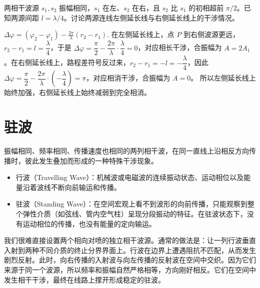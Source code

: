 \documentclass[lang=cn,11pt]{elegantbook}
\begin{document}
\begin{exercise}[两相干波源有初相差时为什么左右延长线不一样]
两相干波源 \(s_1,s_2\) 振幅相同，\(s_1\) 在左、\(s_2\) 在右，且 \(s_2\) 比 \(s_1\) 的初相超前 \(\pi/2\)。已知两源间距 \(l=\lambda/4\)。讨论两源连线左侧延长线与右侧延长线上的干涉情况。
\end{exercise}
\begin{solution}
 \(\Delta\varphi=(\varphi_2-\varphi_1)-\frac{2\pi}{\lambda}(r_2-r_1).\) 
在左侧延长线上，点 \(P\) 到右侧波源更远，\(r_2-r_1=l=\dfrac{\lambda}{4}\)，于是 \(\Delta\varphi=\dfrac{\pi}{2}-\dfrac{2\pi}{\lambda}\cdot\dfrac{\lambda}{4}=0\)，对应相长干涉，合振幅为 \(A=2A_1\)。在右侧延长线上，路程差符号反过来，\(r_2-r_1=-l=-\dfrac{\lambda}{4}\)，因此 \(\Delta\varphi=\dfrac{\pi}{2}-\dfrac{2\pi}{\lambda}\cdot\left(-\dfrac{\lambda}{4}\right)=\pi\)，对应相消干涉，合振幅为 \(A=0\)。
所以左侧延长线上始终加强，右侧延长线上始终减弱到完全相消。
\end{solution}

\section{驻波}

\begin{definition}[驻波]
振幅相同、频率相同、传播速度也相同的两列相干波，在同一直线上沿相反方向传播时，彼此发生叠加而形成的一种特殊干涉现象。
\begin{itemize}
\item 行波（Travelling Wave）：机械波或电磁波的连续振动状态、运动相位以及能量沿着波线不断向前输运和传播。
\item 驻波（Standing Wave）：在空间宏观上看不到波形的向前传播，只能观察到整个弹性介质（如弦线、管内空气柱）呈现分段振动的特征。在驻波状态下，没有运动相位的传播，也没有能量的定向输运。
\end{itemize}
\end{definition}

\begin{note}
我们很难直接设置两个相向对喷的独立相干波源。通常的做法是：让一列行波垂直入射到两种不同介质的终止分界界面上。行波在边界上遭遇阻抗不匹配，从而发生剧烈反射。此时，向右传播的入射波与向左传播的反射波在空间中交织。因为它们来源于同一个波源，所以频率和振幅自然严格相等，方向刚好相反。它们在空间中发生相干干涉，最终在线路上撑开形成稳定的驻波。
\end{note}
\end{document}
